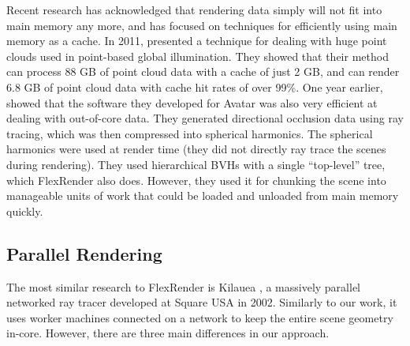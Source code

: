 \documentclass[a4paper,twoside]{article}
\begin{document}
Recent research has acknowledged that rendering data simply will not fit into
main memory any more, and has focused on techniques for efficiently using main
memory as a cache. In 2011, \cite{tabellion:2011} presented a technique for
dealing with huge point clouds used in point-based global illumination. They
showed that their method can process 88 GB of point cloud data with a cache of
just 2 GB, and can render 6.8 GB of point cloud data with cache hit rates of
over 99\%. One year earlier, \cite{pantaleoni:2010} showed that the software
they developed for Avatar was also very efficient at dealing with out-of-core
data. They generated directional occlusion data using ray tracing, which was then
compressed into spherical harmonics. The spherical harmonics were used at render
time (they did not directly ray trace the scenes during rendering). They used
hierarchical BVHs with a single ``top-level'' tree, which FlexRender also does.
However, they used it for chunking the scene into manageable units of work that
could be loaded and unloaded from main memory quickly.

\subsection{Parallel Rendering}
\label{parallelbg}

The most similar research to FlexRender is Kilauea \cite{kato:2002}, a massively
parallel networked ray tracer developed at Square USA in 2002. Similarly to our
work, it uses worker machines connected on a network to keep the entire scene
geometry in-core. However, there are three main differences in our approach.
\end{document}

